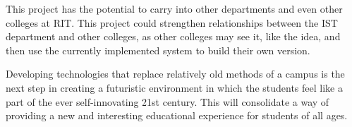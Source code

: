 This project has the potential to carry into other departments and even other colleges at RIT. This project could strengthen relationships between the IST department and other colleges, as other colleges may see it, like the idea, and then use the currently implemented system to build their own version.

Developing technologies that replace relatively old methods of a campus is the next step in creating a futuristic environment in which the students feel like a part of the ever self-innovating 21st century. This will consolidate a way of providing a new and interesting educational experience for students of all ages. 